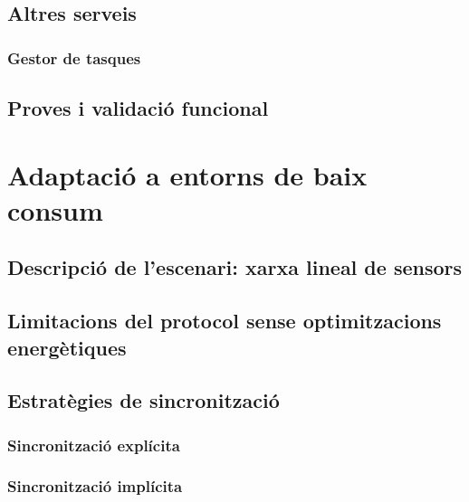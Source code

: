 \documentclass{tfgitic}[2024/07/01]
\begin{document}
{\section{Altres serveis}
\label{sec:altres_serveis}
\subsection{Gestor de tasques}
\section{Proves i validació funcional}

\chapter{Adaptació a entorns de baix consum}
\section{Descripció de l’escenari: xarxa lineal de sensors}
\section{Limitacions del protocol sense optimitzacions energètiques}
\section{Estratègies de sincronització}
\subsection{Sincronització explícita}
\subsection{Sincronització implícita}

}
\end{document}
